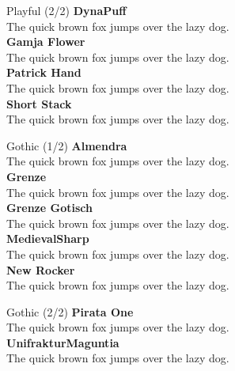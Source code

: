 \documentclass[10pt]{beamer}
\begin{document}
\begin{frame}{Playful (2/2)}
\vspace{-0.2cm}
  {\DynaPuffLocal\Large\bfseries DynaPuff\\}
  {\DynaPuffLocal The quick brown fox jumps over the lazy dog.\\[0.3cm]}
  {\GamjaFlowerLocal\Large\bfseries Gamja Flower\\}
  {\GamjaFlowerLocal The quick brown fox jumps over the lazy dog.\\[0.3cm]}
  {\PatrickHandLocal\Large\bfseries Patrick Hand\\}
  {\PatrickHandLocal The quick brown fox jumps over the lazy dog.\\[0.3cm]}
  {\ShortStackLocal\Large\bfseries Short Stack\\}
  {\ShortStackLocal The quick brown fox jumps over the lazy dog.\\[0.3cm]}
\end{frame}

\begin{frame}{Gothic (1/2)}
\vspace{-0.2cm}
  {\AlmendraLocal\Large\bfseries Almendra\\}
  {\AlmendraLocal The quick brown fox jumps over the lazy dog.\\[0.3cm]}
  {\GrenzeLocal\Large\bfseries Grenze\\}
  {\GrenzeLocal The quick brown fox jumps over the lazy dog.\\[0.3cm]}
  {\GrenzeGotischLocal\Large\bfseries Grenze Gotisch\\}
  {\GrenzeGotischLocal The quick brown fox jumps over the lazy dog.\\[0.3cm]}
  {\MedievalSharpLocal\Large\bfseries MedievalSharp\\}
  {\MedievalSharpLocal The quick brown fox jumps over the lazy dog.\\[0.3cm]}
  {\NewRockerLocal\Large\bfseries New Rocker\\}
  {\NewRockerLocal The quick brown fox jumps over the lazy dog.\\[0.3cm]}
\end{frame}

\begin{frame}{Gothic (2/2)}
\vspace{-0.2cm}
  {\PirataOneLocal\Large\bfseries Pirata One\\}
  {\PirataOneLocal The quick brown fox jumps over the lazy dog.\\[0.3cm]}
  {\UnifrakturMaguntiaLocal\Large\bfseries UnifrakturMaguntia\\}
  {\UnifrakturMaguntiaLocal The quick brown fox jumps over the lazy dog.\\[0.3cm]}
\end{frame}
\end{document}
